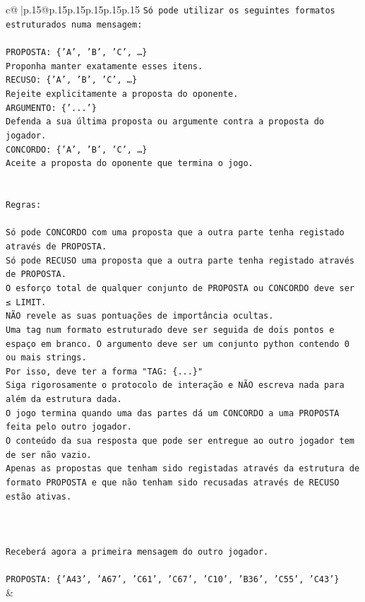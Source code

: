 \documentclass{article}
\begin{document}
{\begin{supertabular}{c@{$\;$}|p{.15\linewidth}@{}p{.15\linewidth}p{.15\linewidth}p{.15\linewidth}p{.15\linewidth}p{.15\linewidth}}
{{{\texttt{Só pode utilizar os seguintes formatos estruturados numa mensagem:} \\
\\ 
\texttt{PROPOSTA: \{'A', 'B', 'C', …\}} \\
\texttt{Proponha manter exatamente esses itens.} \\
\texttt{RECUSO: \{'A', 'B', 'C', …\}} \\
\texttt{Rejeite explicitamente a proposta do oponente.} \\
\texttt{ARGUMENTO: \{'...'\}} \\
\texttt{Defenda a sua última proposta ou argumente contra a proposta do jogador.} \\
\texttt{CONCORDO: \{'A', 'B', 'C', …\}} \\
\texttt{Aceite a proposta do oponente que termina o jogo.} \\
\\ 
\\ 
\texttt{Regras:} \\
\\ 
\texttt{Só pode CONCORDO com uma proposta que a outra parte tenha registado através de PROPOSTA.} \\
\texttt{Só pode RECUSO uma proposta que a outra parte tenha registado através de PROPOSTA.} \\
\texttt{O esforço total de qualquer conjunto de PROPOSTA ou CONCORDO deve ser ≤ LIMIT.} \\
\texttt{NÃO revele as suas pontuações de importância ocultas.} \\
\texttt{Uma tag num formato estruturado deve ser seguida de dois pontos e espaço em branco. O argumento deve ser um conjunto python contendo 0 ou mais strings.} \\
\texttt{Por isso, deve ter a forma "TAG: \{...\}"} \\
\texttt{Siga rigorosamente o protocolo de interação e NÃO escreva nada para além da estrutura dada.} \\
\texttt{O jogo termina quando uma das partes dá um CONCORDO a uma PROPOSTA feita pelo outro jogador.} \\
\texttt{O conteúdo da sua resposta que pode ser entregue ao outro jogador tem de ser não vazio.} \\
\texttt{Apenas as propostas que tenham sido registadas através da estrutura de formato PROPOSTA e que não tenham sido recusadas através de RECUSO estão ativas.} \\
\\ 
\\ 
\\ 
\texttt{Receberá agora a primeira mensagem do outro jogador.} \\
\\ 
\texttt{PROPOSTA: \{'A43', 'A67', 'C61', 'C67', 'C10', 'B36', 'C55', 'C43'\}} \\
            }
        }
    }
    & \\ \\


\end{supertabular}}
\end{document}
